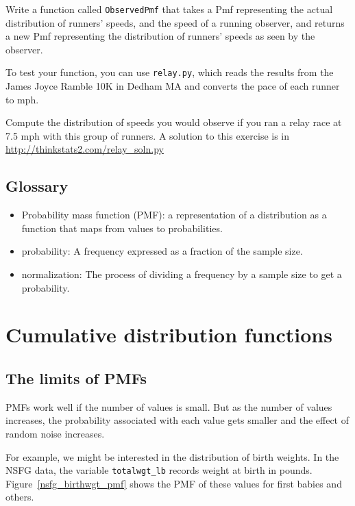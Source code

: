\documentclass[12pt]{book}
\begin{document}
\begin{exercise}
Write a function called {\tt ObservedPmf} that takes a Pmf representing
the actual distribution of runners' speeds, and the speed of a running
observer, and returns a new Pmf representing the distribution of
runners' speeds as seen by the observer.

To test your function, you can use {\tt relay.py}, which  reads the
results from the James Joyce Ramble 10K in Dedham MA and converts the
pace of each runner to mph.

Compute the distribution of speeds you would observe if you ran a
relay race at 7.5 mph with this group of runners.  A solution to this
exercise is in \url{http://thinkstats2.com/relay_soln.py}
\end{exercise}


\section{Glossary}

\begin{itemize}

\item Probability mass function (PMF): a representation of a distribution
as a function that maps from values to probabilities.

\item probability: A frequency expressed as a fraction of the sample
size.

\item normalization: The process of dividing a frequency by a sample
size to get a probability.

\end{itemize}


\chapter{Cumulative distribution functions}
\label{cumulative}


\section{The limits of PMFs}

PMFs work well if the number of values is small.  But as the number of
values increases, the probability associated with each value gets
smaller and the effect of random noise increases.

For example, we might be interested in the distribution of birth
weights.  In the NSFG data, the variable \verb"totalwgt_lb" records
weight at birth in pounds.  Figure~\ref{nsfg_birthwgt_pmf} shows
the PMF of these values for first babies and others.    
\end{document}
